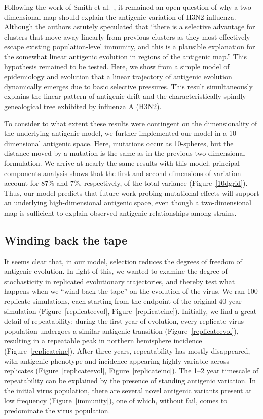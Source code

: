 \documentclass[11pt,oneside,letterpaper]{article}
\begin{document}
Following the work of Smith et al.\ \cite{Smith04}, it remained an open question of why a two-dimensional map should explain the antigenic variation of H3N2 influenza.  Although the authors astutely speculated that ``there is a selective advantage for clusters that move away linearly from previous clusters as they most effectively escape existing population-level immunity, and this is a plausible explanation for the somewhat linear antigenic evolution in regions of the antigenic map.''  This hypothesis remained to be tested.  Here, we show from a simple model of epidemiology and evolution that a linear trajectory of antigenic evolution dynamically emerges due to basic selective pressures.  This result simultaneously explains the linear pattern of antigenic drift \cite{Smith04} and the characteristically spindly genealogical tree \cite{Fitch97} exhibited by influenza A (H3N2).

To consider to what extent these results were contingent on the dimensionality of the underlying antigenic model, we further implemented our model in a 10-dimensional antigenic space.  Here, mutations occur as 10-spheres, but the distance moved by a mutation is the same as in the previous two-dimensional formulation.  We arrive at nearly the same results with this model; principal components analysis shows that the first and second dimensions of variation account for 87\% and 7\%, respectively, of the total variance (Figure~\ref{10dgrid}).  Thus, our model predicts that future work probing mutational effects will support an underlying high-dimensional antigenic space, even though a two-dimensional map is sufficient to explain observed antigenic relationships among strains.

\subsection*{Winding back the tape}

It seems clear that, in our model, selection reduces the degrees of freedom of antigenic evolution.  In light of this, we wanted to examine the degree of stochasticity in replicated evolutionary trajectories, and thereby test what happens when we ``wind back the tape'' \cite{GouldWonderfulLife} on the evolution of the virus.  We ran 100 replicate simulations, each starting from the endpoint of the original 40-year simulation (Figure~\ref{replicateevol}, Figure~\ref{replicateinc}).  Initially, we find a great detail of repeatability; during the first year of evolution, every replicate virus population undergoes a similar antigenic transition (Figure~\ref{replicateevol}), resulting in a repeatable peak in northern hemisphere incidence (Figure~\ref{replicateinc}).  After three years, repeatability has mostly disappeared, with antigenic phenotype and incidence appearing highly variable across replicates (Figure~\ref{replicateevol}, Figure~\ref{replicateinc}).  The 1--2 year timescale of repeatability can be explained by the presence of standing antigenic variation.  In the initial virus population, there are several novel antigenic variants present at low frequency (Figure~\ref{immunity}), one of which, without fail, comes to predominate the virus population.  
\end{document}
